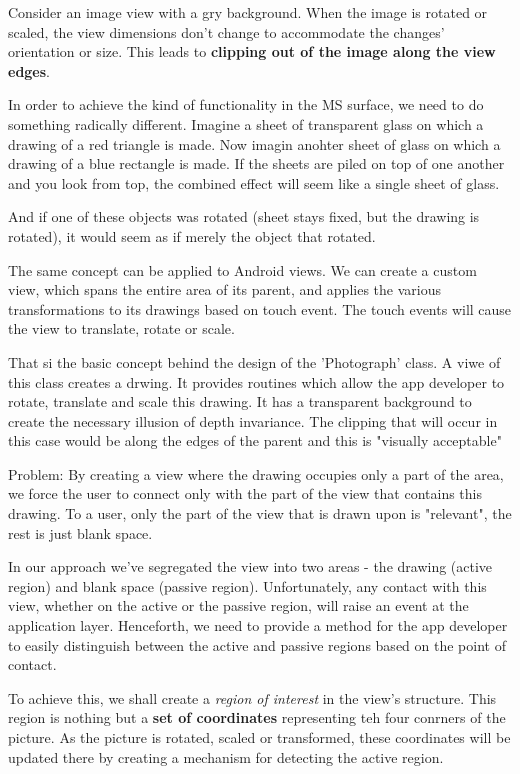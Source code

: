 \documentclass[11pt, a4paper]{book}
\begin{document}
Consider an image view with a gry background. When the image is rotated or
scaled, the view dimensions don't change to accommodate the changes' orientation
or size. This leads to \textbf{clipping out of the image along the view edges}.

In order to achieve the kind of functionality in the MS surface, we need to do
something radically different. Imagine a sheet of transparent glass on which a
drawing of a red triangle is made. Now imagin anohter sheet of glass on which a
drawing of a blue rectangle is made. If the sheets are piled on top of one
another and you look from top, the combined effect will seem like a single sheet
of glass.

And if one of these objects was rotated (sheet stays fixed, but the drawing is
rotated), it would seem as if merely the object that rotated.

The same concept can be applied to Android views. We can create a custom view,
which spans the entire area of its parent, and applies the various
transformations to its drawings based on touch event. The touch events will
cause the view to translate, rotate or scale.

That si the basic concept behind the design of the 'Photograph' class. A viwe of
this class creates a drwing. It provides routines which allow the app developer
to rotate, translate and scale this drawing. It has a transparent background to
create the necessary illusion of depth invariance. The clipping that will occur
in this case would be along the edges of the parent and this is "visually
acceptable"

Problem: By creating a view where the drawing occupies only a part of the area,
we force the user to connect only with the part of the view that contains this
drawing. To a user, only the part of the view that is drawn upon is "relevant",
the rest is just blank space.

In our approach we've segregated the view into two areas - the drawing (active
region) and blank space (passive region). Unfortunately, any contact with this
view, whether on the active or the passive region, will raise an event at the
application layer. Henceforth, we need to provide a method for the app developer
to easily distinguish between the active and passive regions based on the point
of contact.

To achieve this, we shall create a \emph{region of interest} in the view's
structure. This region is nothing but a \textbf{set of coordinates} representing
teh four conrners of the picture. As the picture is rotated, scaled or
transformed, these coordinates will be updated there by creating a mechanism for
detecting the active region.
\end{document}
